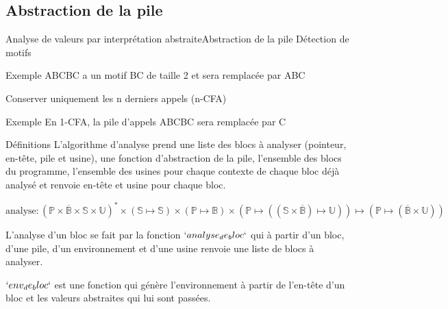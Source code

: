 \documentclass{beamer}
\begin{document}
\subsection{Abstraction de la pile}

\begin{frame}{Analyse de valeurs par interprétation abstraite}{Abstraction de la pile}
    Détection de motifs

    \begin{exampleblock}{Exemple}
        ABCBC a un motif BC de taille 2 et sera remplacée par ABC
    \end{exampleblock}

    Conserver uniquement les n derniers appels (n-CFA)

    \begin{exampleblock}{Exemple}
        En 1-CFA, la pile d'appels ABCBC sera remplacée par C
    \end{exampleblock}
\end{frame}

\iffalse
\begin{frame}{Définitions}
    L'algorithme d'analyse prend une liste des blocs à analyser (pointeur, en-tête, pile et usine), une fonction d'abstraction de la pile, l'ensemble des blocs du programme, l'ensemble des usines pour chaque contexte de chaque bloc déjà analysé et renvoie en-tête et usine pour chaque bloc.

    $\text{analyse} : (\mathbb{P} \times \overline{\mathbb{B}} \times \mathbb{S} \times \mathbb{U})^{*} \times (\mathbb{S} \mapsto \mathbb{S}) \times (\mathbb{P} \mapsto \mathbb{B}) \times (\mathbb{P} \mapsto ((\mathbb{S} \times \overline{\mathbb{B}}) \mapsto \mathbb{U})) \mapsto (\mathbb{P} \mapsto (\overline{\mathbb{B}} \times \mathbb{U}))$

    L'analyse d'un bloc se fait par la fonction $`analyse_de_bloc`$ qui à partir d'un bloc, d'une pile, d'un environnement et d'une usine renvoie une liste de blocs à analyser.

    $`env_de_bloc`$ est une fonction qui génère l'environnement à partir de l'en-tête d'un bloc et les valeurs abstraites qui lui sont passées.
\end{frame}
\end{document}
